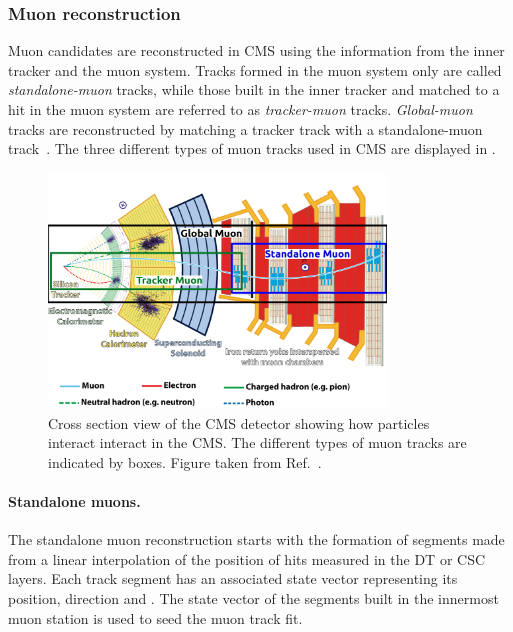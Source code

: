 \subsubsection{Muon reconstruction}\label{sec:Experiment_CMS_Reconstruction_Muon}

Muon candidates are reconstructed in CMS using the information from the inner tracker and the muon system. Tracks formed in the muon system only are called \textit{standalone-muon} tracks, while those built in the inner tracker and matched to a hit in the muon system are referred to as \textit{tracker-muon} tracks. \textit{Global-muon} tracks are reconstructed by matching a tracker track with a standalone-muon track~\cite{MuonReco}. The three different types of muon tracks used in CMS are displayed in .

\begin{figure}[!htbp]
 \centering
 \includegraphics[width=0.8\textwidth]{Figures/Experiment/CMS/MuonReco.png}
 \caption{Cross section view of the CMS detector showing how particles interact interact in the CMS. The different types of muon tracks are indicated by boxes. Figure taken from Ref.~\cite{MuonRecoFig}. }
 \label{fig:MuonReco}
\end{figure}

\paragraph{Standalone muons.} The standalone muon reconstruction starts with the formation of segments made from a linear interpolation of the position of hits measured in the DT or CSC layers. Each track segment has an associated state vector representing its position, direction and \pt. The state vector of the segments built in the innermost muon station is used to seed the muon track fit.

